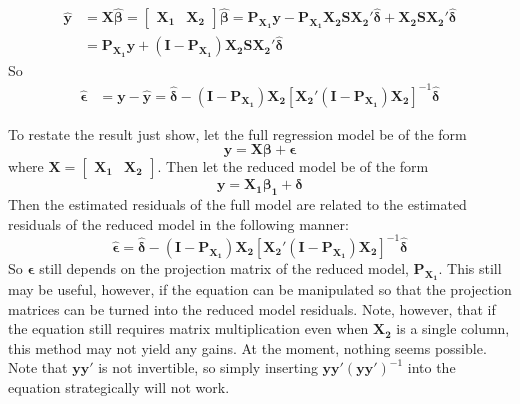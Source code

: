 \documentclass[10pt]{article}
\begin{document}
\begin{align*}
\bm{\hat{y}} &= \bm{X}\bm{\hat{\beta}} = \begin{bmatrix} \bm{X_1} &
  \bm{X_2} \end{bmatrix} \bm{\hat{\beta}} = \bm{P_{X_1}}\bm{y} -
\bm{P_{X_1}}\bm{X_2}\bm{S}\bm{X_2}'\bm{\hat{\delta}} +
\bm{X_2}\bm{S}\bm{X_2}'\bm{\hat{\delta}} \\
&= \bm{P_{X_1}}\bm{y} +
(\bm{I}-\bm{P_{X_1}})\bm{X_2}\bm{S}\bm{X_2}'\bm{\hat{\delta}}
\end{align*}
So
\begin{align*}
\bm{\hat{\epsilon}} &= \bm{y}-\bm{\hat{y}} = \bm{\hat{\delta}} -
(\bm{I}-\bm{P_{X_1}})\bm{X_2}\left[\bm{X_2}'(\bm{I}-\bm{P_{X_1}})\bm{X_2}\right]^{-1}\bm{\hat{\delta}}
\end{align*}

To restate the result just show, let the full regression model be of
the form
\[
\bm{y} = \bm{X}\bm{\beta} + \bm{\epsilon}
\]
where $\bm{X} = \begin{bmatrix} \bm{X_1} &
  \bm{X_2} \end{bmatrix}$. Then let the reduced model be of the form
\[
\bm{y} = \bm{X_1}\bm{\beta_1} + \bm{\delta}
\]
Then the estimated residuals of the full model are related to the
estimated residuals of the reduced model in the following manner:
\[
\bm{\hat{\epsilon}} = \bm{\hat{\delta}} -
(\bm{I}-\bm{P_{X_1}})\bm{X_2}\left[\bm{X_2}'(\bm{I}-\bm{P_{X_1}})\bm{X_2}\right]^{-1}\bm{\hat{\delta}}
\]
So $\bm{\hat{\epsilon}}$ still depends on the projection matrix of the
reduced model, $\bm{P_{X_1}}$. This still may be useful, however, if
the equation can be manipulated so that the projection matrices can be
turned into the reduced model residuals. Note, however, that if the
equation still requires matrix multiplication even when $\bm{X_2}$ is
a single column, this method may not yield any gains. At the moment,
nothing seems possible. Note that $\bm{y}\bm{y}'$ is not invertible,
so simply inserting $\bm{y}\bm{y}'(\bm{y}\bm{y}')^{-1}$ into the
equation strategically will not work.
\end{document}
